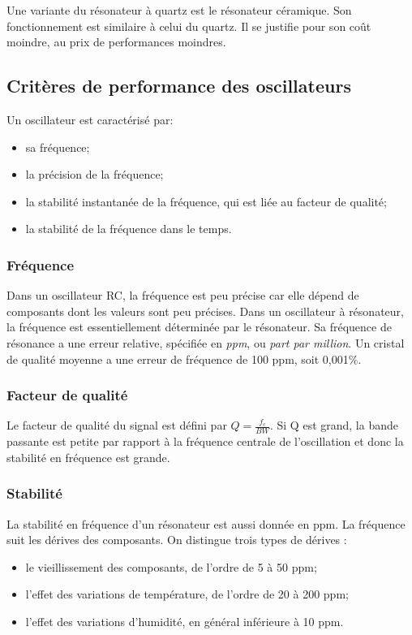 Une variante du résonateur à quartz est le résonateur céramique. Son fonctionnement est similaire à celui du quartz. Il se justifie pour son coût moindre, au prix de performances moindres.

\subsection{Critères de performance des oscillateurs}
Un oscillateur est caractérisé par:
\begin{itemize}[label=\textbullet,font=\small]
\item sa fréquence;
\item la précision de la fréquence;
\item la stabilité instantanée de la fréquence, qui est liée au facteur de qualité;
\item la stabilité de la fréquence dans le temps.
\end{itemize}

\subsubsection*{Fréquence}
Dans un oscillateur RC, la fréquence est peu précise car elle dépend de composants dont les valeurs sont peu précises. Dans un oscillateur à résonateur, la fréquence est essentiellement déterminée par le résonateur. Sa fréquence de résonance a une erreur relative, spécifiée en \textit{ppm}, ou \textit{part par million}. Un cristal de qualité moyenne a une erreur de fréquence de 100 ppm, soit 0,001\%.

\subsubsection*{Facteur de qualité}
Le facteur de qualité du signal est défini par $Q=\frac{f_{c}}{BW}$.
Si Q est grand, la bande passante est petite par rapport à la fréquence centrale de l'oscillation et donc la stabilité en fréquence est grande.

\subsubsection*{Stabilité}
La stabilité en fréquence d'un résonateur est aussi donnée en ppm.
La fréquence suit les dérives des composants. On distingue trois types de dérives :
\begin{itemize}[label=\textbullet,font=\small]
\item le vieillissement des composants, de l'ordre de 5 à 50 ppm;
\item l'effet des variations de température, de l'ordre de 20 à 200 ppm;
\item l'effet des variations d'humidité, en général inférieure à 10 ppm.
\end{itemize}

